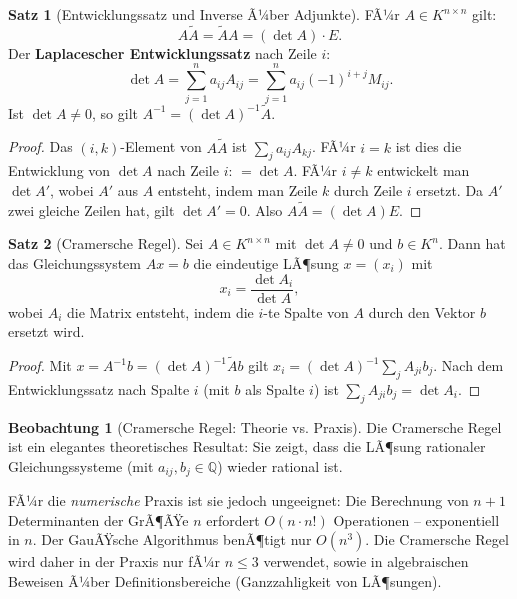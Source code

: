 ﻿\documentclass[a4paper,12pt]{report}
\theoremstyle{definition}
\newtheorem{satz}{Satz}
\newtheorem{beobachtung}{Beobachtung}
\begin{document}
\begin{satz}[Entwicklungssatz und Inverse Ã¼ber Adjunkte]
    FÃ¼r $A \in K^{n \times n}$ gilt:
    \[
        A \tilde{A} = \tilde{A} A = (\det A) \cdot E.
    \]
    Der \textbf{Laplacescher Entwicklungssatz} nach Zeile $i$:
    \[
        \det A = \sum_{j=1}^n a_{ij} A_{ij} = \sum_{j=1}^n a_{ij} (-1)^{i+j} M_{ij}.
    \]
    Ist $\det A \neq 0$, so gilt $A^{-1} = (\det A)^{-1} \tilde{A}$.
\end{satz}
\begin{proof}
    Das $(i,k)$-Element von $A\tilde{A}$ ist $\sum_j a_{ij} A_{kj}$.
    FÃ¼r $i = k$ ist dies die Entwicklung von $\det A$ nach Zeile $i$: $= \det A$.
    FÃ¼r $i \neq k$ entwickelt man $\det A'$, wobei $A'$ aus $A$ entsteht,
    indem man Zeile $k$ durch Zeile $i$ ersetzt. Da $A'$ zwei gleiche
    Zeilen hat, gilt $\det A' = 0$. Also $A\tilde{A} = (\det A) E$.
\end{proof}

\begin{satz}[Cramersche Regel]
    Sei $A \in K^{n \times n}$ mit $\det A \neq 0$ und $b \in K^n$.
    Dann hat das Gleichungssystem $Ax = b$ die eindeutige LÃ¶sung $x = (x_i)$
    mit
    \[
        x_i = \frac{\det A_i}{\det A},
    \]
    wobei $A_i$ die Matrix entsteht, indem die $i$-te Spalte von $A$
    durch den Vektor $b$ ersetzt wird.
\end{satz}
\begin{proof}
    Mit $x = A^{-1}b = (\det A)^{-1}\tilde{A} b$ gilt
    $x_i = (\det A)^{-1} \sum_j A_{ji} b_j$.
    Nach dem Entwicklungssatz nach Spalte $i$ (mit $b$ als Spalte $i$)
    ist $\sum_j A_{ji} b_j = \det A_i$.
\end{proof}

\begin{beobachtung}[Cramersche Regel: Theorie vs. Praxis]
    Die Cramersche Regel ist ein elegantes theoretisches Resultat:
    Sie zeigt, dass die LÃ¶sung rationaler Gleichungssysteme (mit
    $a_{ij}, b_j \in \mathbb{Q}$) wieder rational ist.

    FÃ¼r die \emph{numerische} Praxis ist sie jedoch ungeeignet:
    Die Berechnung von $n+1$ Determinanten der GrÃ¶ÃŸe $n$ erfordert
    $O(n \cdot n!) $ Operationen -- exponentiell in $n$. Der GauÃŸsche
    Algorithmus benÃ¶tigt nur $O(n^3)$.
    Die Cramersche Regel wird daher in der Praxis nur fÃ¼r $n \leq 3$
    verwendet, sowie in algebraischen Beweisen Ã¼ber Definitionsbereiche
    (Ganzzahligkeit von LÃ¶sungen).
\end{beobachtung}
\end{document}
